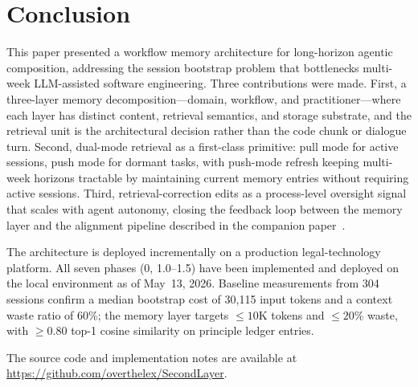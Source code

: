 \documentclass[11pt]{article}
\begin{document}
\section{Conclusion}
\label{sec:conclusion}

This paper presented a workflow memory architecture for long-horizon agentic composition, addressing the session bootstrap problem that bottlenecks multi-week LLM-assisted software engineering.
Three contributions were made.
First, a three-layer memory decomposition---domain, workflow, and practitioner---where each layer has distinct content, retrieval semantics, and storage substrate, and the retrieval unit is the architectural decision rather than the code chunk or dialogue turn.
Second, dual-mode retrieval as a first-class primitive: pull mode for active sessions, push mode for dormant tasks, with push-mode refresh keeping multi-week horizons tractable by maintaining current memory entries without requiring active sessions.
Third, retrieval-correction edits as a process-level oversight signal that scales with agent autonomy, closing the feedback loop between the memory layer and the alignment pipeline described in the companion paper~\citep{ovcharov2026recursive}.

The architecture is deployed incrementally on a production legal-technology platform.
All seven phases (0, 1.0--1.5) have been implemented and deployed on the local environment as of May~13, 2026.
Baseline measurements from 304 sessions confirm a median bootstrap cost of 30{,}115 input tokens and a context waste ratio of 60\%; the memory layer targets ${\leq}10$K tokens and ${\leq}20\%$ waste, with ${\geq}0.80$ top-1 cosine similarity on principle ledger entries.

The source code and implementation notes are available at \url{https://github.com/overthelex/SecondLayer}.




\end{document}
